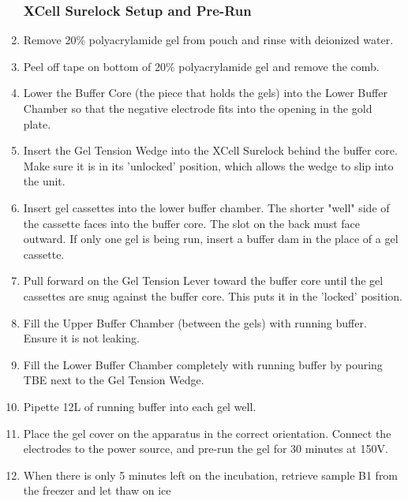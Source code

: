 \documentclass[letterpaper]{article}
\newcommand{\uL}{\micro{}L}
\begin{document}
\begin{enumerate}
\subsubsection{XCell Surelock Setup and Pre-Run}
\item{Remove 20\% polyacrylamide gel from pouch and rinse with deionized water.}
\item{Peel off tape on bottom of 20\% polyacrylamide gel and remove the comb.}
\item{Lower the Buffer Core (the piece that holds the gels) into the Lower Buffer Chamber so that the negative electrode fits into the opening in the gold plate.}
\item{Insert the Gel Tension Wedge into the XCell Surelock behind the buffer core. Make sure it is in its 'unlocked' position, which allows the wedge to slip into the unit.}
\item{Insert gel cassettes into the lower buffer chamber. The shorter "well" side of the cassette faces into the buffer core. The slot on the back must face outward. If only one gel is being run, insert a buffer dam in the place of a gel cassette.}
\item{Pull forward on the Gel Tension Lever toward the buffer core until the gel cassettes are snug against the buffer core. This puts it in the 'locked' position.}
\item{Fill the Upper Buffer Chamber (between the gels) with running buffer. Ensure it is not leaking.}
\item{Fill the Lower Buffer Chamber completely with running buffer by pouring TBE next to the Gel Tension Wedge.}
\item{Pipette 12\uL{} of running buffer into each gel well.}
\item{Place the gel cover on the apparatus in the correct orientation. Connect the electrodes to the power source, and pre-run the gel for 30 minutes at 150V.}
\item{When there is only 5 minutes left on the incubation, retrieve sample B1 from the freezer and let thaw on ice}

\end{enumerate}
\end{document}
